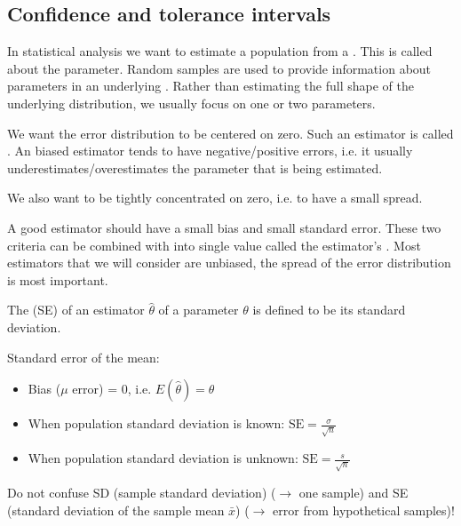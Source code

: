 \subsection{Confidence and tolerance intervals}

In statistical analysis we want to estimate a population from a . This is called  about the parameter. Random samples are used to provide information about parameters in an underlying . Rather than estimating the full shape of the underlying distribution, we usually focus on one or two parameters.

We want the error distribution to be centered on zero. Such an estimator is called . An biased estimator tends to have negative/positive errors, i.e. it usually underestimates/overestimates the parameter that is being estimated.

We also want  to be tightly concentrated on zero, i.e. to have a small spread.

A good estimator should have a small bias and small standard error. These two criteria can be combined with into single value called the estimator's . Most estimators that we will consider are unbiased, the spread of the error distribution is most important. 

\begin{definition}
    The  (SE) of an estimator $\hat{\theta}$ of a parameter $\theta$ is defined to be its standard deviation.
\end{definition}

\begin{example}
    Standard error of the mean:
    \begin{itemize}
        \item Bias ($\mu$ error) = 0, i.e. $E(\hat{\theta})=\theta$
        \item When population standard deviation is known: $\text{SE} = \frac{\sigma}{\sqrt{n}}$
        \item When population standard deviation is unknown: $\text{SE} = \frac{s}{\sqrt{n}}$
    \end{itemize}
\end{example}

Do not confuse SD (sample standard deviation) ($\to$ one sample) and SE (standard deviation of the sample mean $\bar{x}$) ($\to$ error from hypothetical samples)!

